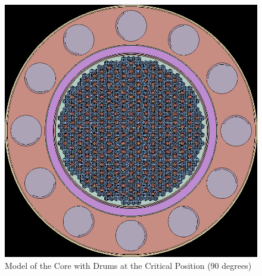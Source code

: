 \documentclass[8pt,a5paper]{article}
\begin{document}
\begin{figure}[h!]
    \centering
    \includegraphics[width=1\linewidth]{figures/Reactor.png}
    \caption{Model of the Core with Drums at the Critical Position (90 degrees)}
    \label{fig:Figure 1}
\end{figure}
\end{document}
